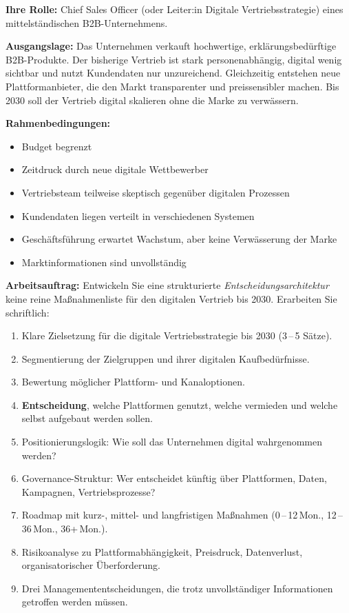 \documentclass[11pt,a4paper,oneside]{article}
\begin{document}
\begin{infobox}
\textbf{Ihre Rolle:} Chief Sales Officer (oder Leiter:in Digitale Vertriebsstrategie) eines mittelständischen B2B-Unternehmens.

\smallskip
\textbf{Ausgangslage:} Das Unternehmen verkauft hochwertige, erklärungsbedürftige B2B-Produkte. Der bisherige Vertrieb ist stark personenabhängig, digital wenig sichtbar und nutzt Kundendaten nur unzureichend. Gleichzeitig entstehen neue Plattformanbieter, die den Markt transparenter und preissensibler machen. Bis 2030 soll der Vertrieb digital skalieren \textendash{} ohne die Marke zu verwässern.

\smallskip
\textbf{Rahmenbedingungen:}
\begin{itemize}
  \item Budget begrenzt
  \item Zeitdruck durch neue digitale Wettbewerber
  \item Vertriebsteam teilweise skeptisch gegenüber digitalen Prozessen
  \item Kundendaten liegen verteilt in verschiedenen Systemen
  \item Geschäftsführung erwartet Wachstum, aber keine Verwässerung der Marke
  \item Marktinformationen sind unvollständig
\end{itemize}
\end{infobox}

\noindent\textbf{Arbeitsauftrag:} Entwickeln Sie eine strukturierte \emph{Entscheidungsarchitektur} \textendash{} keine reine Maßnahmenliste \textendash{} für den digitalen Vertrieb bis 2030. Erarbeiten Sie schriftlich:

\begin{enumerate}
  \item Klare Zielsetzung für die digitale Vertriebsstrategie bis 2030 (3\,--\,5 Sätze).
  \item Segmentierung der Zielgruppen und ihrer digitalen Kaufbedürfnisse.
  \item Bewertung möglicher Plattform- und Kanaloptionen.
  \item \textbf{Entscheidung}, welche Plattformen genutzt, welche vermieden und welche selbst aufgebaut werden sollen.
  \item Positionierungslogik: Wie soll das Unternehmen digital wahrgenommen werden?
  \item Governance-Struktur: Wer entscheidet künftig über Plattformen, Daten, Kampagnen, Vertriebsprozesse?
  \item Roadmap mit kurz-, mittel- und langfristigen Maßnahmen (0\,--\,12\,Mon., 12\,--\,36\,Mon., 36+\,Mon.).
  \item Risikoanalyse zu Plattformabhängigkeit, Preisdruck, Datenverlust, organisatorischer Überforderung.
  \item Drei Managemententscheidungen, die trotz unvollständiger Informationen getroffen werden müssen.
\end{enumerate}
\end{document}
